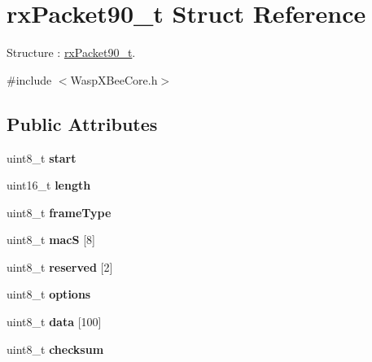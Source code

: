 \hypertarget{structrx_packet90__t}{}\section{rx\+Packet90\+\_\+t Struct Reference}
\label{structrx_packet90__t}


Structure \+: \hyperlink{structrx_packet90__t}{rx\+Packet90\+\_\+t}.  




{\ttfamily \#include $<$Wasp\+X\+Bee\+Core.\+h$>$}

\subsection*{Public Attributes}
\begin{DoxyCompactItemize}
\item 
uint8\+\_\+t {\bfseries start}\hypertarget{structrx_packet90__t_a197697f8d002aa2519c16622c75d02e7}{}\label{structrx_packet90__t_a197697f8d002aa2519c16622c75d02e7}

\item 
uint16\+\_\+t {\bfseries length}\hypertarget{structrx_packet90__t_a5d05ebd1d26f56d2e4aca0277e2d9ceb}{}\label{structrx_packet90__t_a5d05ebd1d26f56d2e4aca0277e2d9ceb}

\item 
uint8\+\_\+t {\bfseries frame\+Type}\hypertarget{structrx_packet90__t_a8fc33c26ab4e0d39b9fb8ec005d695ca}{}\label{structrx_packet90__t_a8fc33c26ab4e0d39b9fb8ec005d695ca}

\item 
uint8\+\_\+t {\bfseries macS} \mbox{[}8\mbox{]}\hypertarget{structrx_packet90__t_a52660004fe903936beead4873ffb41ff}{}\label{structrx_packet90__t_a52660004fe903936beead4873ffb41ff}

\item 
uint8\+\_\+t {\bfseries reserved} \mbox{[}2\mbox{]}\hypertarget{structrx_packet90__t_ab360fe6809089b2b52ed3d3abb8a0f75}{}\label{structrx_packet90__t_ab360fe6809089b2b52ed3d3abb8a0f75}

\item 
uint8\+\_\+t {\bfseries options}\hypertarget{structrx_packet90__t_aeb9572487eda32a64df31b5b744a34ab}{}\label{structrx_packet90__t_aeb9572487eda32a64df31b5b744a34ab}

\item 
uint8\+\_\+t {\bfseries data} \mbox{[}100\mbox{]}\hypertarget{structrx_packet90__t_a65ab851e1a1cddb00516b9d372c50024}{}\label{structrx_packet90__t_a65ab851e1a1cddb00516b9d372c50024}

\item 
uint8\+\_\+t {\bfseries checksum}\hypertarget{structrx_packet90__t_adc2d02a150249f8048ca93a19ba77a91}{}\label{structrx_packet90__t_adc2d02a150249f8048ca93a19ba77a91}

\end{DoxyCompactItemize}


